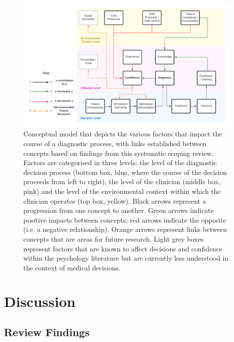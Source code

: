 \documentclass[a4paper, nobind]{templates/ociamthesis}
\begin{document}
\begin{figure}[H]

{\centering \includegraphics[width=1\linewidth]{./assets/ReviewModel} 

}

\caption{Conceptual model that depicts the various factors that impact the course of a diagnostic process, with links established between concepts based on findings from this systematic scoping review. Factors are categorised in three levels: the level of the diagnostic decision process (bottom box, blue, where the course of the decision proceeds from left to right), the level of the clinician (middle box, pink) and the level of the environmental context within which the clinician operates (top box, yellow). Black arrows represent a progression from one concept to another. Green arrows indicate positive impacts between concepts; red arrows indicate the opposite (i.e. a negative relationship). Orange arrows represent links between concepts that are areas for future research. Light grey boxes represent factors that are known to affect decisions and confidence within the psychology literature but are currently less understood in the context of medical decisions.}\label{fig:reviewmodel}
\end{figure}

\section{Discussion}\label{discussion}

\subsection{Review Findings}\label{review-findings}
\end{document}
